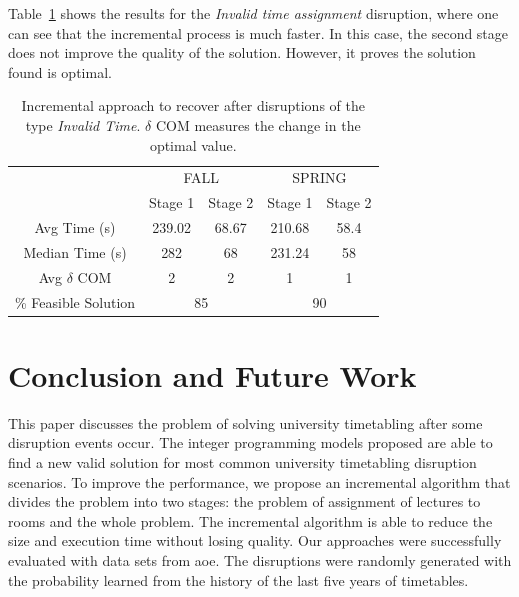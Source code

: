 \documentclass[runningheads]{llncs}
\newcommand{\uni}{\gls{aoe}}
\begin{document}
Table~\ref{tab:ite} shows the results for the \textit{Invalid time assignment} disruption, where one can see that the incremental process is much faster. In this case, the second stage does not improve the quality of the solution. However, it proves the solution found is optimal.

\begin{table}[t]
\centering
\caption{Incremental approach to recover after disruptions of the type \textit{Invalid Time}. $\delta$ COM measures the change in the optimal value.}
\label{tab:ite}
\begin{tabular}{c|c|c|c|c|}
\cline{2-5}
                                                      & \multicolumn{2}{c|}{\textsc{FALL}} & \multicolumn{2}{c|}{\textsc{SPRING}} \\ \cline{2-5} 
                                                      & Stage 1     & Stage 2     & Stage 1      & Stage 2      \\ \hline
\multicolumn{1}{|c|}{Avg Time (s)}                & 239.02 & 68.67 & 210.68      & 58.4         \\ \hline
\multicolumn{1}{|c|}{Median Time (s)}                 & 282         & 68          & 231.24       & 58           \\ \hline
\multicolumn{1}{|c|}{Avg $\delta$ COM}                     & 2           & 2           & 1            & 1            \\ \hline
\multicolumn{1}{|c|}{\% Feasible Solution} & \multicolumn{2}{c|}{85}   & \multicolumn{2}{c|}{90}     \\ \hline
\end{tabular}
\vspace{-.5cm}
\end{table}


\section{Conclusion and Future Work}\label{sec:con}

This paper discusses the problem of solving university timetabling after some disruption events occur. The integer programming models proposed are able to find a new valid solution for most common university timetabling disruption scenarios. 
%
To improve the performance, we propose an incremental algorithm that divides the problem into two stages: the problem of assignment of lectures to rooms and the whole problem. The incremental algorithm is able to reduce the size and execution time without losing quality. 
%
Our approaches were successfully evaluated with data sets from \uni. The disruptions were randomly generated with the probability learned from the history of the last five years of timetables. 
\end{document}
